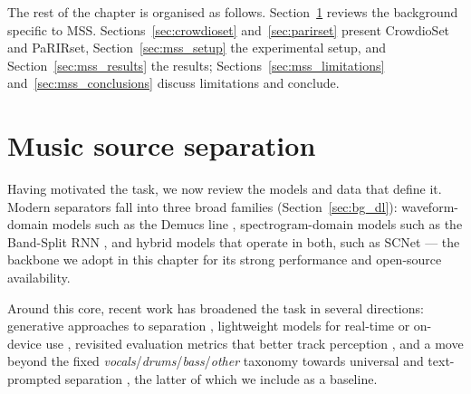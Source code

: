 The rest of the chapter is organised as follows. Section~\ref{sec:sota_mss}
reviews the background specific to \acrshort{MSS}. Sections~\ref{sec:crowdioset}
and~\ref{sec:parirset} present CrowdioSet and PaRIRset, Section~\ref{sec:mss_setup}
the experimental setup, and Section~\ref{sec:mss_results} the results;
Sections~\ref{sec:mss_limitations} and~\ref{sec:mss_conclusions} discuss
limitations and conclude.

\section{Music source separation}
\label{sec:sota_mss}

Having motivated the task, we now review the models and data that define it.
Modern separators fall into three broad families (Section~\ref{sec:bg_dl}):
waveform-domain models such as the Demucs line \citep{rouard2023htdemucs},
spectrogram-domain models such as the Band-Split RNN \citep{luo2023bsrnn}, and
hybrid models that operate in both, such as SCNet \citep{tong2024scnet} --- the
backbone we adopt in this chapter for its strong performance and open-source
availability. 


Around this core, recent work has broadened the task in several
directions: generative approaches to separation \citep{plaja2025generating},
lightweight models for real-time or on-device use
\citep{hung2025moises, venkatesh2024real}, revisited evaluation metrics that
better track perception \citep{jaffe2025musical, sheridan2025perceptual}, and a
move beyond the fixed \emph{vocals}/\emph{drums}/\emph{bass}/\emph{other}
taxonomy towards universal \citep{postolache2023adversarial} and text-prompted
separation \citep{shi2025samaudio}, the latter of which we include as a
baseline. 

